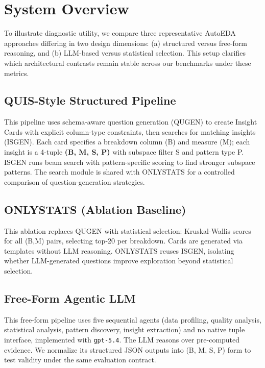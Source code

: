 \documentclass[conference]{IEEEtran}
\begin{document}
\section{System Overview}

To illustrate diagnostic utility, we compare three representative AutoEDA approaches differing in two design dimensions: (a) structured versus free-form reasoning, and (b) LLM-based versus statistical selection. This setup clarifies which architectural contrasts remain stable across our benchmarks under these metrics.

\subsection{QUIS-Style Structured Pipeline}

This pipeline uses schema-aware question generation (QUGEN) to create Insight Cards with explicit column-type constraints, then searches for matching insights (ISGEN). Each card specifies a breakdown column (B) and measure (M); each insight is a 4-tuple \textbf{(B, M, S, P)} with subspace filter S and pattern type P. ISGEN runs beam search with pattern-specific scoring to find stronger subspace patterns. The search module is shared with ONLYSTATS for a controlled comparison of question-generation strategies.

\subsection{ONLYSTATS (Ablation Baseline)}

This ablation replaces QUGEN with statistical selection: Kruskal-Wallis scores~\cite{kruskal} for all (B,M) pairs, selecting top-20 per breakdown. Cards are generated via templates without LLM reasoning. ONLYSTATS reuses ISGEN, isolating whether LLM-generated questions improve exploration beyond statistical selection.

\subsection{Free-Form Agentic LLM}

This free-form pipeline uses five sequential agents (data profiling, quality analysis, statistical analysis, pattern discovery, insight extraction) and no native tuple interface, implemented with \texttt{gpt-5.4}. The LLM reasons over pre-computed evidence. We normalize its structured JSON outputs into (B, M, S, P) form to test validity under the same evaluation contract.
\end{document}
